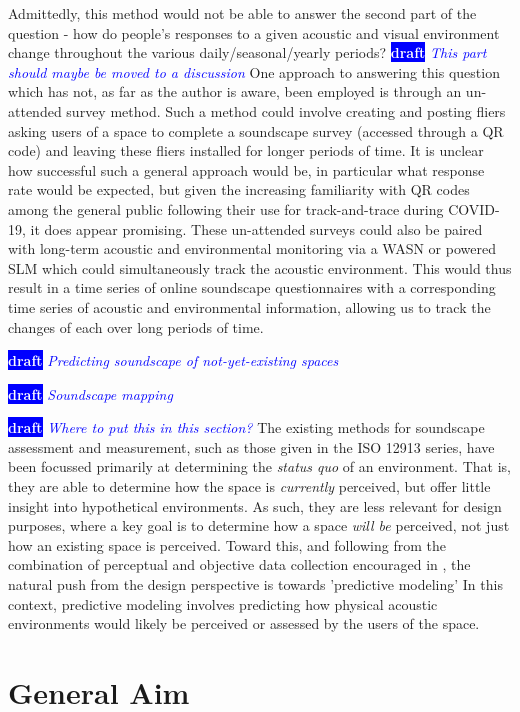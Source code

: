 \documentclass[twoside,fontsize=12pt,titlepage]{scrbook}
\newcommand{\remark}[3]{%
    {\colorbox{#2}{\sffamily\scriptsize\bfseries\textcolor{white}{#1}}}
    {\sffamily\small\itshape\textcolor{#2}{#3}}
}
\newcommand{\draft}[1]{\remark{draft}{blue}{#1}}
\begin{document}
 Admittedly, this method would not be able to answer the second part of the question - how do people's responses to a given acoustic and visual environment change throughout the various daily/seasonal/yearly periods? \draft{This part should maybe be moved to a discussion}One approach to answering this question which has not, as far as the author is aware, been employed is through an un-attended survey method. Such a method could involve creating and posting fliers asking users of a space to complete a soundscape survey (accessed through a QR code) and leaving these fliers installed for longer periods of time. It is unclear how successful such a general approach would be, in particular what response rate would be expected, but given the increasing familiarity with QR codes among the general public following their use for track-and-trace during COVID-19, it does appear promising. These un-attended surveys could also be paired with long-term acoustic and environmental monitoring via a WASN or powered SLM which could simultaneously track the acoustic environment. This would thus result in a time series of online soundscape questionnaires with a corresponding time series of acoustic and environmental information, allowing us to track the changes of each over long periods of time.

 \draft{Predicting soundscape of not-yet-existing spaces}

 \draft{Soundscape mapping}

 \draft{Where to put this in this section?}The existing methods for soundscape assessment and measurement, such as those given in the ISO 12913 series, have been focussed primarily at determining the \emph{status quo} of an environment. That is, they are able to determine how the space is \emph{currently} perceived, but offer little insight into hypothetical environments. As such, they are less relevant for design purposes, where a key goal is to determine how a space \emph{will be} perceived, not just how an existing space is perceived. Toward this, and following from the combination of perceptual and objective data collection encouraged in \citet{ISO12913_2_2018IOS}, the natural push from the design perspective is towards 'predictive modeling' In this context, predictive modeling involves predicting how physical acoustic environments would likely be perceived or assessed by the users of the space.




\section{General Aim}
\end{document}
